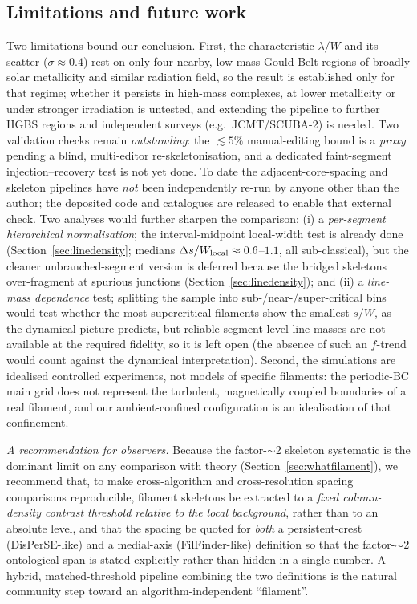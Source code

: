 \documentclass[usenatbib,twoside,twocolumn]{mnras}
\begin{document}
\subsection{Limitations and future work}
\label{sec:limitations}

Two limitations bound our conclusion. First, the characteristic $\lambda/W$ and its scatter ($\sigma\approx0.4$) rest on only four nearby, low-mass Gould Belt regions of broadly solar metallicity and similar radiation field, so the result is established only for that regime; whether it persists in high-mass complexes, at lower metallicity or under stronger irradiation is untested, and extending the pipeline to further HGBS regions and independent surveys (e.g.\ JCMT/SCUBA-2) is needed. Two validation checks remain \emph{outstanding}: the $\lesssim5\%$ manual-editing bound is a \emph{proxy} pending a blind, multi-editor re-skeletonisation, and a dedicated faint-segment injection--recovery test is not yet done. To date the adjacent-core-spacing and skeleton pipelines have \emph{not} been independently re-run by anyone other than the author; the deposited code and catalogues are released to enable that external check. Two analyses would further sharpen the comparison: (i) a \emph{per-segment hierarchical normalisation}; the interval-midpoint local-width test is already done (Section~\ref{sec:linedensity}; medians $\Delta s/W_{\rm local}\approx0.6$--$1.1$, all sub-classical), but the cleaner unbranched-segment version is deferred because the bridged skeletons over-fragment at spurious junctions (Section~\ref{sec:linedensity}); and (ii) a \emph{line-mass dependence} test; splitting the sample into sub-/near-/super-critical bins would test whether the most supercritical filaments show the smallest $s/W$, as the dynamical picture predicts, but reliable segment-level line masses are not available at the required fidelity, so it is left open (the absence of such an $f$-trend would count against the dynamical interpretation). Second, the simulations are idealised controlled experiments, not models of specific filaments: the periodic-BC main grid does not represent the turbulent, magnetically coupled boundaries of a real filament, and our ambient-confined configuration is an idealisation of that confinement.

\smallskip\noindent\emph{A recommendation for observers.} Because the factor-$\sim$2 skeleton systematic is the dominant limit on any comparison with theory (Section~\ref{sec:whatfilament}), we recommend that, to make cross-algorithm and cross-resolution spacing comparisons reproducible, filament skeletons be extracted to a \emph{fixed column-density contrast threshold relative to the local background}, rather than to an absolute level, and that the spacing be quoted for \emph{both} a persistent-crest (DisPerSE-like) and a medial-axis (FilFinder-like) definition so that the factor-$\sim$2 ontological span is stated explicitly rather than hidden in a single number. A hybrid, matched-threshold pipeline combining the two definitions is the natural community step toward an algorithm-independent ``filament''.
\end{document}
